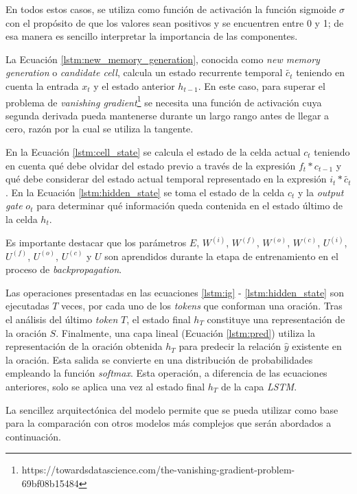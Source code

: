 En todos estos casos, se utiliza como función de activación la función sigmoide $\sigma$ con el propósito de que los valores sean positivos y se encuentren entre 0 y 1; de esa manera es sencillo interpretar la importancia de las componentes.

La Ecuación \ref{lstm:new_memory_generation}, conocida como \textit{new memory generation} o \textit{candidate cell}, calcula un estado recurrente temporal $\tilde{c_{t}}$ teniendo en cuenta la entrada $x_{t}$ y el estado anterior $h_{t-1}$. En este caso, para superar el problema de \textit{vanishing gradient}\footnote{https://towardsdatascience.com/the-vanishing-gradient-problem-69bf08b15484} se necesita una función de activación cuya segunda derivada pueda mantenerse durante un largo rango antes de llegar a cero, razón por la cual se utiliza la tangente.

En la Ecuación \ref{lstm:cell_state} se calcula el estado de la celda actual $c_{t}$ teniendo en cuenta qué debe olvidar del estado previo a través de la expresión $f_{t}*c_{t-1}$ y qué debe considerar del estado actual temporal representado en la expresión $i_{t}*\tilde{c_{t}}$. En la Ecuación \ref{lstm:hidden_state} se toma el estado de la celda $c_{t}$ y la \textit{output gate} $o_{t}$ para determinar qué información queda contenida en el estado último de la celda $h_{t}$.

Es importante destacar que los parámetros $E$, $W^{(i)}$, $W^{(f)}$, $W^{(o)}$, $W^{(c)}$, $U^{(i)}$, $U^{(f)}$, $U^{(o)}$, $U^{(c)}$ y $U$ son aprendidos durante la etapa de entrenamiento en el proceso de \textit{backpropagation}.

Las operaciones presentadas en las ecuaciones \ref{lstm:ig} - \ref{lstm:hidden_state} son ejecutadas $T$ veces, por cada uno de los \textit{tokens} que conforman una oración. Tras el análisis del último \textit{token} $T$, el estado final $h_{T}$ constituye una representación de la oración $S$. Finalmente, una capa lineal (Ecuación \ref{lstm:pred}) utiliza la representación de la oración obtenida $h_{T}$ para predecir la relación $\hat{y}$ existente en la oración. Esta salida se convierte en una distribución de probabilidades empleando la función \textit{softmax}. Esta operación, a diferencia de las ecuaciones anteriores, solo se aplica una vez al estado final $h_{T}$ de la capa \textit{LSTM}.

La sencillez arquitectónica del modelo permite que se pueda utilizar como base para la comparación con otros modelos más complejos que serán abordados a continuación.

